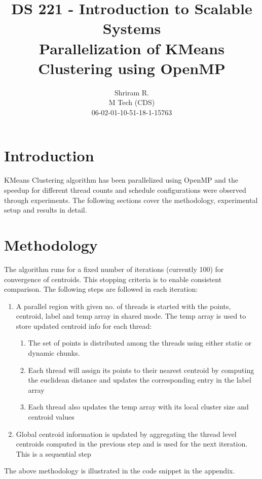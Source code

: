 \documentclass[11pt,a4paper,oneside]{article}
\begin{document}
	\title{DS 221 - Introduction to Scalable Systems \\ Parallelization of KMeans Clustering using OpenMP}
	\author{Shriram R. \\ M Tech (CDS) \\ 06-02-01-10-51-18-1-15763}
	\maketitle
	
	\section{Introduction}
	KMeans Clustering algorithm has been parallelized using OpenMP and the speedup for different thread counts and schedule configurations were observed through experiments. The following sections cover the methodology, experimental setup and results in detail.
	
	\section{Methodology}
	The algorithm runs for a fixed number of iterations (currently 100) for convergence of centroids. This stopping criteria is to enable consistent comparison. The following steps are followed in each iteration:
	\begin{enumerate}
		\item A parallel region with given no. of threads is started with the points, centroid, label and temp array in shared mode. The temp array is used to store updated centroid info for each thread:
		\begin{enumerate}
		\item The set of points is distributed among the threads using either static or dynamic chunks.
		\item Each thread will assign its points to their nearest centroid by computing the euclidean distance and updates the corresponding entry in the label array
		\item Each thread also updates the temp array with its local cluster size and centroid values
	    \end{enumerate}
		\item Global centroid information is updated by aggregating the thread level centroids computed in the previous step and is used for the next iteration. This is a sequential step
	\end{enumerate}
    The above methodology is illustrated in the code snippet in the appendix.
	
\end{document}
